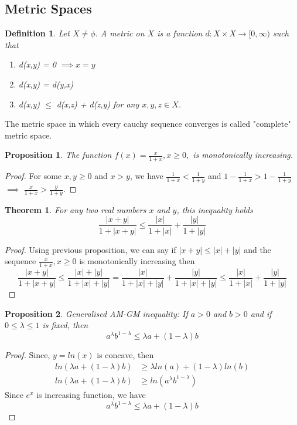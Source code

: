 \documentclass[12pt]{report}
\newtheorem{thm}{Theorem}
\newtheorem{defn}{Definition}
\newtheorem{prop}{Proposition}
\begin{document}
\subsection*{Metric Spaces}
\begin{defn}
    Let $X \neq \phi$. A metric on $X$ is a function $d:X \times X \to [0, \infty)$ such that 
    \begin{enumerate}
        \item d(x,y) = 0 $\implies x = y$
        \item d(x,y) = d(y,x)
        \item d(x,y) $\leq$ d(x,z) + d(z,y) for any $x,y,z \in X$.
    \end{enumerate}
\end{defn}
The metric space in which every cauchy sequence converges is called "complete" metric space.
\begin{prop}
    The function $f(x) = \frac{x}{1+x}, x \geq 0,$ is monotonically increasing. 
\end{prop}
\begin{proof}
    For some $x, y \geq 0$ and $x > y$, we have $\frac{1}{1+x} < \frac{1}{1+y}$ and $1-\frac{1}{1+x} > 1-\frac{1}{1+y}$ $\implies$ $ \frac{x}{1+x} > \frac{y}{1+y}$. 
\end{proof}
\begin{thm}
    For any two real numbers $x$ and $y$, this inequality holds
    $$ \frac{|x+y|}{1+|x+y|} \leq \frac{|x|}{1+|x|} + \frac{|y|}{1+|y|}$$
\end{thm}
\begin{proof}
    Using previous proposition, we can say if $|x+y| \leq |x| + |y|$ and the sequence $\frac{x}{1+x}, x \geq 0$ is monotonically increasing then
    $$ \frac{|x+y|}{1+|x+y|} \leq \frac{|x| + |y|}{1+ |x| + |y|} = \frac{|x|}{1+|x| + |y|} + \frac{|y|}{1+|x| + |y|} \leq \frac{|x|}{1+|x|} + \frac{|y|}{1+|y|}$$ 
\end{proof}
\begin{prop}
    Generalised AM-GM inequality: If $a > 0$ and $b > 0$ and if $0 \leq \lambda \leq 1$ is fixed, then
    $$ a^{\lambda}b^{1-\lambda} \leq \lambda a + (1-\lambda)b$$ 
\end{prop}
\begin{proof}
    Since, $ y = ln(x)$ is concave, then
    \begin{align*}
        ln(\lambda a + (1-\lambda)b) &\geq \lambda ln(a) + (1-\lambda)ln(b)\\
        ln(\lambda a + (1-\lambda)b) &\geq ln(a^{\lambda} b^{1-\lambda})
    \end{align*}
Since $e^x$ is increasing function, we have
$$ a^{\lambda} b^{1-\lambda} \leq \lambda a + (1-\lambda)b$$
\end{proof}
\end{document}
